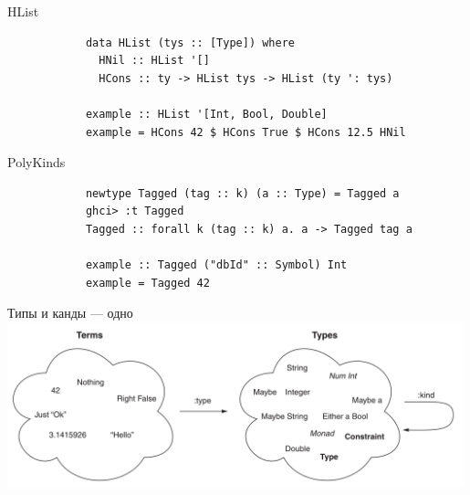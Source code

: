     \begin{frame}[fragile]{HList}
        \pause
        \begin{verbatim}
            data HList (tys :: [Type]) where
              HNil :: HList '[]
              HCons :: ty -> HList tys -> HList (ty ': tys)

            example :: HList '[Int, Bool, Double]
            example = HCons 42 $ HCons True $ HCons 12.5 HNil
        \end{verbatim}
    \end{frame}

    \begin{frame}[fragile]{PolyKinds}
        \pause
        \begin{verbatim}
            newtype Tagged (tag :: k) (a :: Type) = Tagged a
            ghci> :t Tagged
            Tagged :: forall k (tag :: k) a. a -> Tagged tag a

            example :: Tagged ("dbId" :: Symbol) Int
            example = Tagged 42
        \end{verbatim}
    \end{frame}

    \begin{frame}[fragile]{Типы и канды --- одно}
        \pause
        \includegraphics[width=0.99\textwidth]{figs/types-eq-kinds}
    \end{frame}


